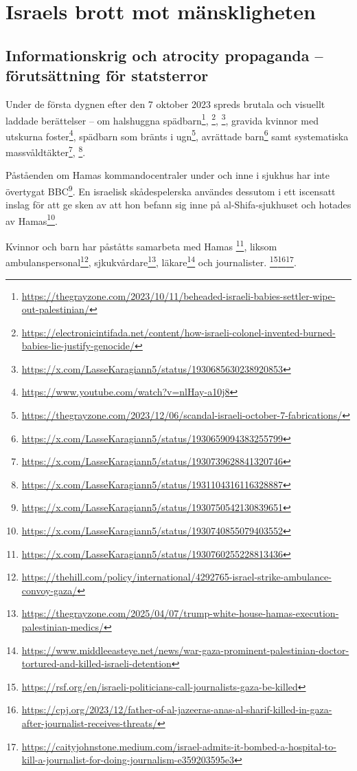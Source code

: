 

\newpage

\section{Israels brott mot mänskligheten}

\subsection{Informationskrig och atrocity propaganda – förutsättning för statsterror}



Under de första dygnen efter den 7 oktober 2023 spreds brutala och visuellt laddade berättelser – om halshuggna spädbarn\footnote{\url{https://thegrayzone.com/2023/10/11/beheaded-israeli-babies-settler-wipe-out-palestinian/}}, 
\footnote{\url{https://electronicintifada.net/content/how-israeli-colonel-invented-burned-babies-lie-justify-genocide/}}, 
\footnote{\url{https://x.com/LasseKaragiann5/status/1930685630238920853}}, 
gravida kvinnor med utskurna foster\footnote{\url{https://www.youtube.com/watch?v=nlHay-a10j8}}, 
spädbarn som bränts i ugn\footnote{\url{https://thegrayzone.com/2023/12/06/scandal-israeli-october-7-fabrications/}}, 
avrättade barn\footnote{\url{https://x.com/LasseKaragiann5/status/1930659094383255799}} samt 
systematiska massvåldtäkter\footnote{\url{https://x.com/LasseKaragiann5/status/1930739628841320746}}, 
\footnote{\url{https://x.com/LasseKaragiann5/status/1931104316116328887}}.



Påståenden om Hamas kommandocentraler under och inne i sjukhus har inte övertygat BBC\footnote{\url{https://x.com/LasseKaragiann5/status/1930750542130839651}}. En israelisk skådespelerska användes dessutom i ett iscensatt inslag för att ge sken av att hon befann sig inne på al-Shifa-sjukhuset och hotades av Hamas\footnote{\url{https://x.com/LasseKaragiann5/status/1930740855079403552}}.

Kvinnor och barn har påståtts samarbeta med Hamas \footnote{\url{https://x.com/LasseKaragiann5/status/1930760255228813436}}, liksom ambulanspersonal\footnote{\url{https://thehill.com/policy/international/4292765-israel-strike-ambulance-convoy-gaza/}}, sjkukvårdare\footnote{\url{https://thegrayzone.com/2025/04/07/trump-white-house-hamas-execution-palestinian-medics/}}, läkare\footnote{\url{https://www.middleeasteye.net/news/war-gaza-prominent-palestinian-doctor-tortured-and-killed-israeli-detention}} och journalister.
\footnote{\url{https://rsf.org/en/israeli-politicians-call-journalists-gaza-be-killed}}\footnote{\url{https://cpj.org/2023/12/father-of-al-jazeeras-anas-al-sharif-killed-in-gaza-after-journalist-receives-threats/}}\footnote{\url{https://caityjohnstone.medium.com/israel-admits-it-bombed-a-hospital-to-kill-a-journalist-for-doing-journalism-e359203595e3}}. 





